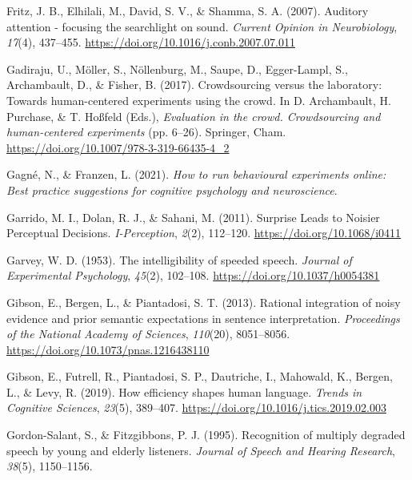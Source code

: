 \documentclass[a4paper, nobind]{templates/ociamthesis}
\newlength{\cslhangindent}
\newenvironment{CSLReferences}[2] %
 {%
  \setlength{\parindent}{0pt}
  \ifodd #1
  \let\oldpar\par
  \def\par{\hangindent=\cslhangindent\oldpar}
  \fi
  \setlength{\parskip}{1mm}
  \setlength{\baselineskip}{6mm}
 }%
 {}
\begin{document}
\begin{CSLReferences}{1}{0}
\leavevmode{}%
Fritz, J. B., Elhilali, M., David, S. V., \& Shamma, S. A. (2007). {Auditory attention - focusing the searchlight on sound}. \emph{Current Opinion in Neurobiology}, \emph{17}(4), 437--455. \url{https://doi.org/10.1016/j.conb.2007.07.011}

\leavevmode{}%
Gadiraju, U., Möller, S., Nöllenburg, M., Saupe, D., Egger-Lampl, S., Archambault, D., \& Fisher, B. (2017). {Crowdsourcing versus the laboratory: Towards human-centered experiments using the crowd}. In D. Archambault, H. Purchase, \& T. Hoßfeld (Eds.), \emph{Evaluation in the crowd. Crowdsourcing and human-centered experiments} (pp. 6--26). Springer, Cham. \url{https://doi.org/10.1007/978-3-319-66435-4_2}

\leavevmode{}%
Gagné, N., \& Franzen, L. (2021). \emph{How to run behavioural experiments online: Best practice suggestions for cognitive psychology and neuroscience}.

\leavevmode{}%
Garrido, M. I., Dolan, R. J., \& Sahani, M. (2011). Surprise Leads to Noisier Perceptual Decisions. \emph{I-Perception}, \emph{2}(2), 112--120. \url{https://doi.org/10.1068/i0411}

\leavevmode{}%
Garvey, W. D. (1953). {The intelligibility of speeded speech}. \emph{Journal of Experimental Psychology}, \emph{45}(2), 102--108. \url{https://doi.org/10.1037/h0054381}

\leavevmode{}%
Gibson, E., Bergen, L., \& Piantadosi, S. T. (2013). Rational integration of noisy evidence and prior semantic expectations in sentence interpretation. \emph{Proceedings of the National Academy of Sciences}, \emph{110}(20), 8051--8056. \url{https://doi.org/10.1073/pnas.1216438110}

\leavevmode{}%
Gibson, E., Futrell, R., Piantadosi, S. P., Dautriche, I., Mahowald, K., Bergen, L., \& Levy, R. (2019). How efficiency shapes human language. \emph{Trends in Cognitive Sciences}, \emph{23}(5), 389--407. \url{https://doi.org/10.1016/j.tics.2019.02.003}

\leavevmode{}%
Gordon-Salant, S., \& Fitzgibbons, P. J. (1995). {Recognition of multiply degraded speech by young and elderly listeners}. \emph{Journal of Speech and Hearing Research}, \emph{38}(5), 1150--1156.


\end{CSLReferences}
\end{document}
